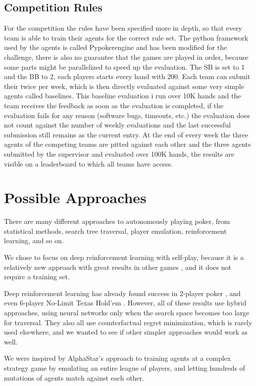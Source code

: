 \subsection{Competition Rules}
For the competition the rules have been specified more in depth, so that every team is able to train their agents for the correct rule set. The python framework used by the agents is called Pypokerengine  and has been modified for the challenge, there is also no guarantee that the games are played in order, because some parts might be parallelized to speed up the evaluation. The SB is set to 1 and the BB to 2, each players starts every hand with 200. Each team can submit their twice per week, which is then directly evaluated against some very simple agents called baselines. This baseline evaluation i run over 10K hands and the team receives the feedback as soon as the evaluation is completed, if the evaluation fails for any reason (software bugs, timeouts, etc.) the evaluation does not count against the number of weekly evaluations and the last successful submission still remains as the current entry. At the end of every week the three agents of the competing teams are pitted against each other and the three agents submitted by the supervisor and evaluated over 100K hands, the results are visible on a leaderboard to which all teams have access.

\section{Possible Approaches}
There are many different approaches to autonomously playing poker, from statistical methods, search tree traversal, player emulation, reinforcement learning, and so on. 

We chose to focus on deep reinforcement learning with self-play, because it is a relatively new approach with great results in other games \cite{GamesRL} \cite{OpenAIFive} \cite{Alphago} \cite{AlphaStar}, and it does not require a training set.

Deep reinforcement learning has already found success in 2-player poker \cite{Deepstack} \cite{Libratus}, and even 6-player No-Limit Texas Hold'em \cite{Pluribus}. However, all of these results use hybrid approaches, using neural networks only when the search space becomes too large for traversal. They also all use counterfactual regret minimization, which is rarely used elsewhere, and we wanted to see if other simpler approaches would work as well. 

We were inspired by AlphaStar's \cite{AlphaStar} approach to training agents at a complex strategy game by emulating an entire league of players, and letting hundreds of mutations of agents match against each other.